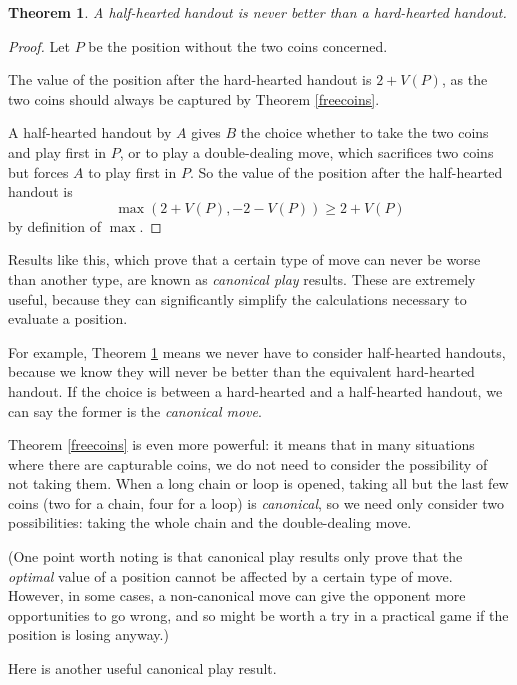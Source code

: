 \documentclass[a4paper,twocolumn]{article}
\newtheorem{halfheartedbad}[thm]{Theorem}
\begin{document}
\begin{halfheartedbad}\label{halfheartedbad}
  A half-hearted handout is never better than a hard-hearted handout.
\end{halfheartedbad}
\begin{proof}
  Let $P$ be the position without the two coins concerned.

  The value of the position after the hard-hearted handout is
  $2+V(P)$, as the two coins should always be captured by Theorem
  \ref{freecoins}.

  A half-hearted handout by $A$ gives $B$ the choice whether to take
  the two coins and play first in $P$, or to play a double-dealing
  move, which sacrifices two coins but forces $A$ to play first in
  $P$. So the value of the position after the half-hearted handout
  is $$\max(2+V(P),-2-V(P)) \ge 2+V(P)$$ by definition of $\max$.
\end{proof}

Results like this, which prove that a certain type of move can never
be worse than another type, are known as \emph{canonical play}
results. These are extremely useful, because they can significantly
simplify the calculations necessary to evaluate a position.

For example, Theorem \ref{halfheartedbad} means we never have to
consider half-hearted handouts, because we know they will never be
better than the equivalent hard-hearted handout. If the choice is
between a hard-hearted and a half-hearted handout, we can say the
former is the \emph{canonical move}.

Theorem \ref{freecoins} is even more powerful: it means that in many
situations where there are capturable coins, we do not need to
consider the possibility of not taking them. When a long chain or loop
is opened, taking all but the last few coins (two for a chain, four
for a loop) is \emph{canonical}, so we need only consider two
possibilities: taking the whole chain and the double-dealing move.

(One point worth noting is that canonical play results only prove that
the \emph{optimal} value of a position cannot be affected by a certain
type of move. However, in some cases, a non-canonical move can give
the opponent more opportunities to go wrong, and so might be worth a
try in a practical game if the position is losing anyway.)

Here is another useful canonical play result.
\end{document}
